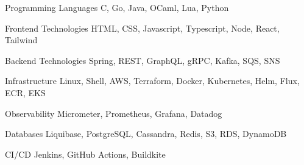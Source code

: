


\begin{cvskills}

  \cvskill
    {Programming Languages}
    {C, Go, Java, OCaml, Lua, Python}

  \cvskill
    {Frontend Technologies}
    {HTML, CSS, Javascript, Typescript, Node, React, Tailwind}

  \cvskill
    {Backend Technologies}
    {Spring, REST, GraphQL, gRPC, Kafka, SQS, SNS}

  \cvskill
     {Infrastructure}
     {Linux, Shell, AWS, Terraform, Docker, Kubernetes, Helm, Flux, ECR, EKS}

  \cvskill
     {Observability}
     {Micrometer, Prometheus, Grafana, Datadog}

  \cvskill
    {Databases}
    {Liquibase, PostgreSQL, Cassandra, Redis, S3, RDS, DynamoDB}

  \cvskill
     {CI/CD}
     {Jenkins, GitHub Actions, Buildkite}


\end{cvskills}

